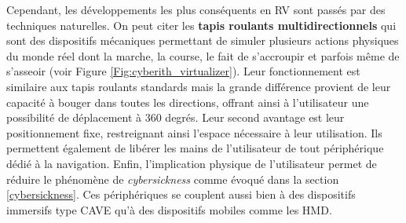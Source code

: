 Cependant, les développements les plus conséquents en RV sont passés par des techniques naturelles. 
On peut citer les \textbf{tapis roulants multidirectionnels} qui sont des dispositifs mécaniques permettant de simuler plusieurs actions physiques du monde réel dont la marche, la course, le fait de s'accroupir et parfois même de s'asseoir (voir Figure \ref{Fig:cyberith_virtualizer}). Leur fonctionnement est similaire aux tapis roulants standards mais la grande différence provient de leur capacité à bouger dans toutes les directions, offrant ainsi à l'utilisateur une possibilité de déplacement à 360 degrés. Leur second avantage est leur positionnement fixe, restreignant ainsi l'espace nécessaire à leur utilisation. Ils permettent également de libérer les mains de l'utilisateur de tout périphérique dédié à la navigation. Enfin, l'implication physique de l'utilisateur permet de réduire le phénomène de \textit{cybersickness} comme évoqué dans la section \ref{cybersickness}.
Ces périphériques se couplent aussi bien à des dispositifs immersifs type CAVE qu'à des dispositifs mobiles comme les HMD.

